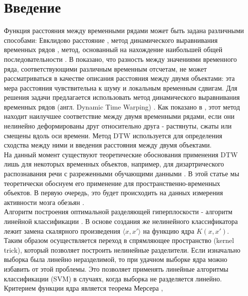 \documentclass[12pt, twoside]{article}
\begin{document}
\section{Введение}
{Функция расстояния между временными рядами может быть задана различными
способами: Евклидово расстояние \cite{Evklid}, метод динамического выравнивания временных
рядов \cite{DTW1} \cite{DTW2}, метод, основанный на нахождение наибольшей общей последовательности \cite{MaxSequence}.
В \cite{Noise} показано, что разность между значениями временного ряда, соответствующими различным временным отсчетам, не может рассматриваться в качестве описания расстояния между двумя объектами: эта мера расстояния чувствительна к
шуму и локальным временным сдвигам. Для решения задачи предлагается использовать метод динамического выравнивания временных рядов (англ. Dynamic Time
Warping) \cite{DTW}. Как показано в \cite{Thebestmethod}, этот метод находит наилучшее соответствие между
двумя временными рядами, если они нелинейно деформированы друг относительно
друга - растянуты, сжаты или смещены вдоль оси времени. Метод DTW используется для определения сходства между ними и введения расстояния между двумя
объектами.\\

На данный момент существуют теоретические обоснования применения DTW лишь для некоторых временных объектов, например, для дизартрического распознавания речи с разреженными обучающими данными \cite{DisartreSpeech}. В этой статье мы теоретически обоснуем его применение для пространственно-временных объектов. В первую очередь, это будет происходить на данных измерения активности мозга обезьян \cite{Data}.\\


Алгоритм построения оптимальной разделяющей гиперплоскости - алгоритм линейной классификации \cite{SVM_Bennett}. В основе создания же нелинейного классификатора лежит замена скалярного произведения $\langle x, x' \rangle$ на функцию ядра $K(x, x')$. Таким образом осуществляется переход в спрямляющее пространство (kernel trick), который позволяет построить нелинейные разделители. Если изначально выборка была линейно неразделимой, то при удачном выборке ядра можно избавить от этой проблемы. Это позволяет применять линейные алгоритмы классификации (SVM) в случаях, когда выборка не разделяется линейно. Критерием функции ядра является теорема Мерсера \cite{Mercer},\\




}
\end{document}

